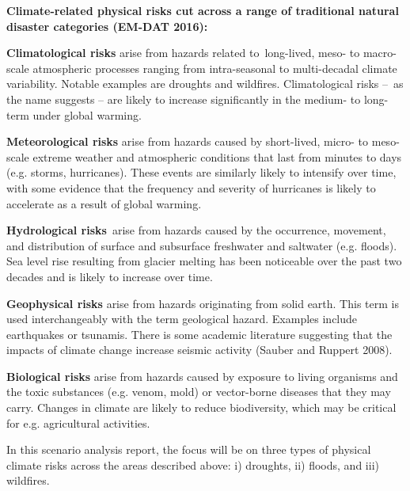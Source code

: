 \documentclass[10pt,table,a4]{article}\usepackage[]{graphicx}\usepackage[]{color}
\begin{document}
	
	\begin{multicols}{2}
		\textbf{Climate-related physical risks cut across a range of traditional natural disaster categories (EM-DAT 2016):}
		
		\textbf{Climatological risks} arise from hazards related to long-lived, meso- to macro-scale atmospheric processes ranging from intra-seasonal to multi-decadal climate variability. Notable examples are droughts and wildfires. Climatological risks – as the name suggests – are likely to increase significantly in the medium- to long-term under global warming.
		
		\textbf{Meteorological risks} arise from hazards caused by short-lived, micro- to meso-scale extreme weather and atmospheric conditions that last from minutes to days (e.g. storms, hurricanes). These events are similarly likely to intensify over time, with some evidence that the frequency and severity of hurricanes is likely to accelerate as a result of global warming.
		
		\textbf{Hydrological risks} arise from hazards caused by the occurrence, movement, and distribution of surface and subsurface freshwater and saltwater (e.g. floods). Sea level rise resulting from glacier melting has been noticeable over the past two decades and is likely to increase over time.
		
		\textbf{Geophysical risks} arise from hazards originating from solid earth. This term is used interchangeably with the term geological hazard. Examples include earthquakes or tsunamis. There is some academic literature suggesting that the impacts of climate change increase seismic activity (Sauber and Ruppert 2008).
		
		\textbf{Biological risks} arise from hazards caused by exposure to living organisms and the toxic substances (e.g. venom, mold) or vector-borne diseases that they may carry. Changes in climate are likely to reduce biodiversity, which may be critical for e.g. agricultural activities.
		
		In this scenario analysis report, the focus will be on three types of physical climate risks across the areas described above: i) droughts, ii) floods, and iii) wildfires.
		
		
	\end{multicols}
\end{document}
